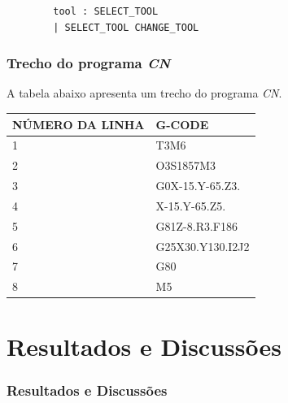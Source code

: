\documentclass[aspectratio=169]{beamer}
\begin{document}
{\begin{frame}[fragile]
\begin{itemize}
\begin{lstlisting}
        tool : SELECT_TOOL
        | SELECT_TOOL CHANGE_TOOL    
    \end{lstlisting}
  \end{itemize}

\end{frame}  


\begin{frame}[fragile]
  \frametitle{Trecho do programa \emph{CN}}

  A tabela abaixo apresenta um trecho do programa \emph{CN}.

  \vspace{3mm}

  \begin{tabular}{l|l}
    \hline
    \scriptsize{\bfseries{NÚMERO DA LINHA}} & 
    \scriptsize{\bfseries{G-CODE}} \\
    \hline

    \scriptsize{1} & \scriptsize{T3M6} \\    
    \hline

    \scriptsize{2} & \scriptsize{O3S1857M3} \\
    \hline

    \scriptsize{3} & \scriptsize{G0X-15.Y-65.Z3.} \\
    \hline
      
    \scriptsize{4} & \scriptsize{X-15.Y-65.Z5.} \\
    \hline

    \scriptsize{5} & \scriptsize{G81Z-8.R3.F186} \\
    \hline

    \scriptsize{6} & \scriptsize{G25X30.Y130.I2J2} \\
    \hline

    \scriptsize{7} & \scriptsize{G80} \\
    \hline

    \scriptsize{8} & \scriptsize{M5} \\
    \hline
      
  \end{tabular}

\end{frame}  


\section{Resultados e Discussões}

\begin{frame}[fragile]
  \frametitle{Resultados e Discussões}


\end{frame}}
\end{document}
